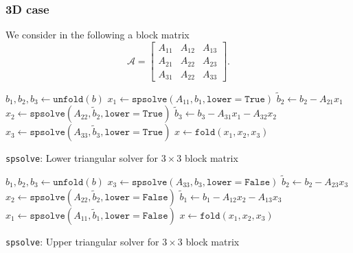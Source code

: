 \subsubsection*{3D case}
We consider in the following a block matrix 
%
\begin{equation} %
\mathcal{A} =\begin{bmatrix}
 A_{11} & A_{12} & A_{13}  \\
 A_{21} & A_{22} & A_{23}  \\
 A_{31} & A_{22} & A_{33}  
\end{bmatrix}.
\end{equation}
%

\begin{minipage}{0.5\textwidth}
\begin{algorithm}[H]
\DontPrintSemicolon
\SetAlgoLined
{}
\BlankLine

  $b_1, b_2, b_3 \gets \texttt{unfold}(b)$ \; 
  $x_1 \gets \texttt{spsolve}(A_{11}, b_1, \texttt{lower}=\texttt{True})$  \;                        
  $\tilde{b}_2 \gets b_2 - A_{21} x_1$ \;            
  $x_2 \gets \texttt{spsolve}(A_{22}, \tilde{b}_2, \texttt{lower}=\texttt{True})$ \;            
  $\tilde{b}_3 \gets b_3 - A_{31} x_1 - A_{32} x_2$ \;
  $x_3 \gets \texttt{spsolve}(A_{33}, \tilde{b}_3, \texttt{lower}=\texttt{True})$ \;
  $x \gets \texttt{fold}(x_1, x_2, x_3)$ \; 

\caption{\texttt{spsolve}: Lower triangular solver for $3 \times 3$ block matrix}
\end{algorithm} 
\end{minipage}
\begin{minipage}{0.5\textwidth}
\begin{algorithm}[H]
\DontPrintSemicolon
\SetAlgoLined
{}
\BlankLine

  $b_1, b_2, b_3 \gets \texttt{unfold}(b)$ \; 
  $x_3 \gets \texttt{spsolve}(A_{33}, b_3, \texttt{lower}=\texttt{False})$ \;                        
  $\tilde{b}_2 \gets b_2 - A_{23} x_3$ \;            
  $x_2 \gets \texttt{spsolve}(A_{22}, \tilde{b}_2, \texttt{lower}=\texttt{False})$ \;            
  $\tilde{b}_1 \gets b_1 - A_{12} x_2 - A_{13} x_3$ \;
  $x_1 \gets \texttt{spsolve}(A_{11}, \tilde{b}_1, \texttt{lower}=\texttt{False})$ \;
  $x \gets \texttt{fold}(x_1, x_2, x_3)$ \; 

\caption{\texttt{spsolve}: Upper triangular solver for $3 \times 3$ block matrix}
\end{algorithm} 
\end{minipage}

